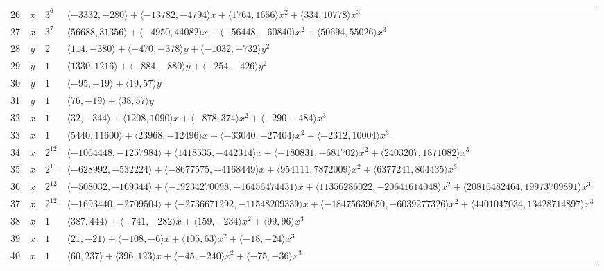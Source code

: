 \documentclass[11pt]{article}
\begin{document}
{\begin{longtable}{@{}rcl>{\raggedright\arraybackslash}p{}@{}}
26 & $x$ & $3^{6}$ & $\langle -3332,-280\rangle+\langle -13782,-4794\rangle x+\langle 1764,1656\rangle x^{2}+\langle 334,10778\rangle x^{3}$\\
27 & $x$ & $3^{7}$ & $\langle 56688,31356\rangle+\langle -4950,44082\rangle x+\langle -56448,-60840\rangle x^{2}+\langle 50694,55026\rangle x^{3}$\\
28 & $y$ & $2$ & $\langle 114,-380\rangle+\langle -470,-378\rangle y+\langle -1032,-732\rangle y^{2}$\\
29 & $y$ & $1$ & $\langle 1330,1216\rangle+\langle -884,-880\rangle y+\langle -254,-426\rangle y^{2}$\\
30 & $y$ & $1$ & $\langle -95,-19\rangle+\langle 19,57\rangle y$\\
31 & $y$ & $1$ & $\langle 76,-19\rangle+\langle 38,57\rangle y$\\
32 & $x$ & $1$ & $\langle 32,-344\rangle+\langle 1208,1090\rangle x+\langle -878,374\rangle x^{2}+\langle -290,-484\rangle x^{3}$\\
33 & $x$ & $1$ & $\langle 5440,11600\rangle+\langle 23968,-12496\rangle x+\langle -33040,-27404\rangle x^{2}+\langle -2312,10004\rangle x^{3}$\\
34 & $x$ & $2^{12}$ & $\langle -1064448,-1257984\rangle+\langle 1418535,-442314\rangle x+\langle -180831,-681702\rangle x^{2}+\langle 2403207,1871082\rangle x^{3}$\\
35 & $x$ & $2^{11}$ & $\langle -628992,-532224\rangle+\langle -8677575,-4168449\rangle x+\langle 954111,7872009\rangle x^{2}+\langle 6377241,804435\rangle x^{3}$\\
36 & $x$ & $2^{12}$ & $\langle -508032,-169344\rangle+\langle -19234270098,-16456474431\rangle x+\langle 11356286022,-20641614048\rangle x^{2}+\langle 20816482464,19973709891\rangle x^{3}$\\
37 & $x$ & $2^{12}$ & $\langle -1693440,-2709504\rangle+\langle -2736671292,-11548209339\rangle x+\langle -18475639650,-6039277326\rangle x^{2}+\langle 4401047034,13428714897\rangle x^{3}$\\
38 & $x$ & $1$ & $\langle 387,444\rangle+\langle -741,-282\rangle x+\langle 159,-234\rangle x^{2}+\langle 99,96\rangle x^{3}$\\
39 & $x$ & $1$ & $\langle 21,-21\rangle+\langle -108,-6\rangle x+\langle 105,63\rangle x^{2}+\langle -18,-24\rangle x^{3}$\\
40 & $x$ & $1$ & $\langle 60,237\rangle+\langle 396,123\rangle x+\langle -45,-240\rangle x^{2}+\langle -75,-36\rangle x^{3}$\\

\end{longtable}}
\end{document}
